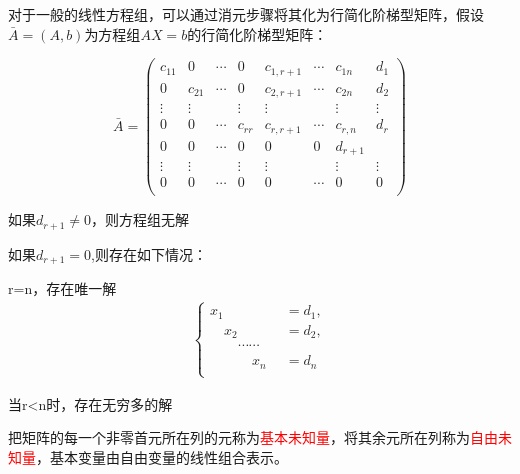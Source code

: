 \begin{keypoint}

    \begin{center}
    \end{center}

    对于一般的线性方程组，可以通过消元步骤将其化为行简化阶梯型矩阵，假设$\bar A=(A,b)$为方程组$AX=b$的行简化阶梯型矩阵：

\begin{equation*}
        \bar A=\begin{pmatrix}
            c_{11}&0&\cdots&0&c_{1,r+1}&\cdots&c_{1n}&d_1\\
            0&c_{21}&\cdots&0&c_{2,r+1}&\cdots&c_{2n}&d_2\\
            \vdots&\vdots&\ &\vdots&\vdots&\ &\vdots&\vdots\\
            0&0&\cdots&c_{rr}&c_{r,r+1}&\cdots&c_{r,n}&d_{r}\\
            0&0&\cdots&0&0&0&d_{r+1}\\
            \vdots&\vdots&\ &\vdots&\vdots&\ &\vdots&\vdots\\
            0&0&\cdots&0&0&\cdots&0&0\\
        \end{pmatrix}
\end{equation*}

如果$d_{r+1}\neq 0$，则方程组无解

如果$d_{r+1}=0$,则存在如下情况：

\begin{asparaenum}
    \item r=n，存在唯一解
    $$
    \begin{aligned}
        \begin{cases}
            x_1\quad \quad \quad &=d_1,\\
            \quad x_2\quad \quad &=d_2,\\
            \quad \quad \cdots\cdots\quad &\\
            \quad\quad \quad  x_n&=d_n\\
        \end{cases}
    \end{aligned}
    $$

    \item 当r<n时，存在无穷多的解
    
    把矩阵的每一个非零首元所在列的元称为\textcolor{red}{基本未知量}，将其余元所在列称为\textcolor{red}{自由未知量}，基本变量由自由变量的线性组合表示。
\end{asparaenum}
\end{keypoint}

